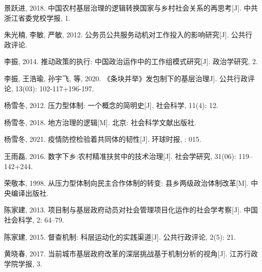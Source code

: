 \documentclass[
  12pt,
]{ctexart}
\newlength{\cslhangindent}
\newlength{\cslentryspacingunit} %
\newenvironment{CSLReferences}[2] %
 {%
  \setlength{\parindent}{0pt}
  \ifodd #1
  \let\oldpar\par
  \def\par{\hangindent=\cslhangindent\oldpar}
  \fi
  \setlength{\parskip}{#2\cslentryspacingunit}
 }%
 {}
\begin{document}
\begin{CSLReferences}{1}{0}
\leavevmode{}%
景跃进, 2018. 中国农村基层治理的逻辑转换\textemdash\textemdash 国家与乡村社会关系的再思考{[}J{]}. 中共浙江省委党校学报, 1.

\leavevmode{}%
朱光楠, 李敏, 严敏, 2012. 公务员公共服务动机对工作投入的影响研究{[}J{]}. 公共行政评论.

\leavevmode{}%
李振, 2014. 推动政策的执行: 中国政治运作中的工作组模式研究{[}J{]}. 政治学研究, 2.

\leavevmode{}%
李振, 王浩瑜, 孙宇飞, 等, 2020. {《条块并举》}发包制下的基层治理\textemdash\textemdash{{以T区乡镇政府的精准扶贫工作为例}}{[}J{]}. 公共行政评论, 13(03): 102-117+196-197.

\leavevmode{}%
杨雪冬, 2012. 压力型体制: 一个概念的简明史{[}J{]}. 社会科学, 11(4): 12.

\leavevmode{}%
杨雪冬, 2018. {地方治理的逻辑}{[}M{]}. {北京}: {社会科学文献出版社}.

\leavevmode{}%
杨雪冬, 2021. 疫情防控检验着共同体的韧性{[}J{]}. 环球时报, : 015.

\leavevmode{}%
王雨磊, 2016. 数字下乡:农村精准扶贫中的技术治理{[}J{]}. 社会学研究, 31(06): 119--142+244.

\leavevmode{}%
荣敬本, 1998. 从压力型体制向民主合作体制的转变: 县乡两级政治体制改革{[}M{]}. {中央编译出版社}.

\leavevmode{}%
陈家建, 2013. 项目制与基层政府动员\textemdash\textemdash 对社会管理项目化运作的社会学考察{[}J{]}. 中国社会科学, 2: 64--79.

\leavevmode{}%
陈家建, 2015. 督查机制: 科层运动化的实践渠道{[}J{]}. 公共行政评论, 2(5): 21.

\leavevmode{}%
黄晓春, 2017. 当前城市基层政府改革的深层挑战\textemdash\textemdash 基于机制分析的视角{[}J{]}. 江苏行政学院学报, 3.

\end{CSLReferences}
\end{document}

